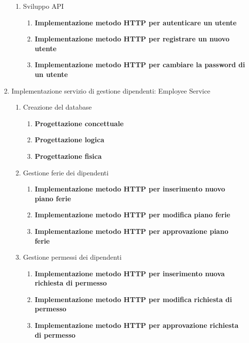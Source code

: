 \documentclass{article}
\begin{document}
\begin{enumerate}
\begin{enumerate}
            \item Sviluppo API
            \begin{enumerate}
                \item \textbf{Implementazione metodo HTTP per autenticare un utente}
                \item \textbf{Implementazione metodo HTTP per registrare un nuovo utente}
                \item \textbf{Implementazione metodo HTTP per cambiare la password di un utente}
            \end{enumerate}
        \end{enumerate}
        \item Implementazione servizio di gestione dipendenti: Employee Service
        \begin{enumerate}
            \item Creazione del database
            \begin{enumerate}
                \item \textbf{Progettazione concettuale}
                \item \textbf{Progettazione logica}
                \item \textbf{Progettazione fisica}
            \end{enumerate}
            \item Gestione ferie dei dipendenti
            \begin{enumerate}
                \item \textbf{Implementazione metodo HTTP per inserimento nuovo piano ferie}
                \item \textbf{Implementazione metodo HTTP per modifica piano ferie}
                \item \textbf{Implementazione metodo HTTP per approvazione piano ferie}
            \end{enumerate}
            \item Gestione permessi dei dipendenti
            \begin{enumerate}
                \item \textbf{Implementazione metodo HTTP per inserimento nuova richiesta di permesso}
                \item \textbf{Implementazione metodo HTTP per modifica richiesta di permesso}
                \item \textbf{Implementazione metodo HTTP per approvazione richiesta di permesso}
            \end{enumerate}

\end{enumerate}
\end{enumerate}
\end{document}
